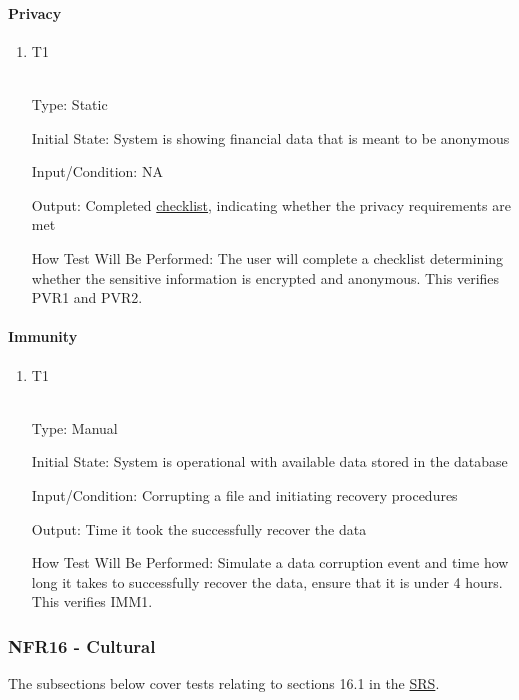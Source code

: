 \documentclass[12pt, titlepage]{article}
\begin{document}
\paragraph{Privacy}
\begin{enumerate}
\item {T1\\}\\
\hypertarget{NFR15.3-TC1}{}

Type: Static

Initial State: System is showing financial data that is meant to be anonymous

Input/Condition: NA

Output: Completed \hyperlink{checklist-nfr15}{checklist}, indicating whether the privacy requirements are met

How Test Will Be Performed: The user will complete a checklist determining whether the sensitive information is encrypted and anonymous. This verifies PVR1 and PVR2.
\end{enumerate}
\paragraph{Immunity}
\begin{enumerate}
\item {T1\\}\\
\hypertarget{NFR15.4-TC1}{}

Type: Manual

Initial State: System is operational with available data stored in the database

Input/Condition: Corrupting a file and initiating recovery procedures

Output: Time it took the successfully recover the data

How Test Will Be Performed: Simulate a data corruption event and time how long it takes to successfully recover the data, ensure that it is under 4 hours. This verifies IMM1.
\end{enumerate}
\subsubsection{NFR16 - Cultural}

The subsections below cover tests relating to sections 16.1 in the \href{https://shorturl.at/FdAgR}{SRS}.
\end{document}
